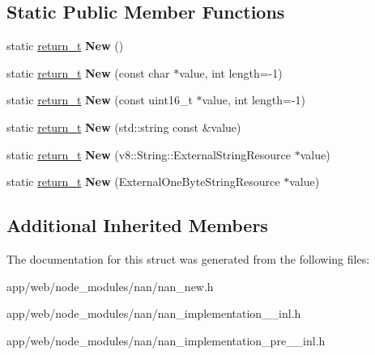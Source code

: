 \subsection*{Static Public Member Functions}
\begin{DoxyCompactItemize}
\item 
\mbox{\label{structimp_1_1_factory_3_01v8_1_1_string_01_4_ad68491f645e9f8a7302a978d08f341d8}} 
static \hyperlink{class_maybe_local}{return\+\_\+t} {\bfseries New} ()
\item 
\mbox{\label{structimp_1_1_factory_3_01v8_1_1_string_01_4_a99b3d520c7f7810fb01a356456ab817d}} 
static \hyperlink{class_maybe_local}{return\+\_\+t} {\bfseries New} (const char $\ast$value, int length=-\/1)
\item 
\mbox{\label{structimp_1_1_factory_3_01v8_1_1_string_01_4_af5b50876506717b889e461c8e11520d0}} 
static \hyperlink{class_maybe_local}{return\+\_\+t} {\bfseries New} (const uint16\+\_\+t $\ast$value, int length=-\/1)
\item 
\mbox{\label{structimp_1_1_factory_3_01v8_1_1_string_01_4_aae4f70ef71b2521d86ba77a913353346}} 
static \hyperlink{class_maybe_local}{return\+\_\+t} {\bfseries New} (std\+::string const \&value)
\item 
\mbox{\label{structimp_1_1_factory_3_01v8_1_1_string_01_4_a643587413f29e619a14ec5ba68f4684d}} 
static \hyperlink{class_maybe_local}{return\+\_\+t} {\bfseries New} (v8\+::\+String\+::\+External\+String\+Resource $\ast$value)
\item 
\mbox{\label{structimp_1_1_factory_3_01v8_1_1_string_01_4_ae20432a507502e62639fd0bf64e6d5c4}} 
static \hyperlink{class_maybe_local}{return\+\_\+t} {\bfseries New} (External\+One\+Byte\+String\+Resource $\ast$value)
\end{DoxyCompactItemize}
\subsection*{Additional Inherited Members}


The documentation for this struct was generated from the following files\+:\begin{DoxyCompactItemize}
\item 
app/web/node\+\_\+modules/nan/nan\+\_\+new.\+h\item 
app/web/node\+\_\+modules/nan/nan\+\_\+implementation\+\_\+\_\+inl.\+h\item 
app/web/node\+\_\+modules/nan/nan\+\_\+implementation\+\_\+pre\+\_\+\_\+inl.\+h\end{DoxyCompactItemize}

